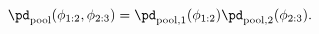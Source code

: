 \begin{equation}
  \pd_{\text{pool}} (\phi_{1:2}, \phi_{2:3}) = \pd_{\text{pool}, 1}(\phi_{1:2}) \pd_{\text{pool}, 2}(\phi_{2:3}).
  \label{eqn:silly-linear-overall}
\end{equation}